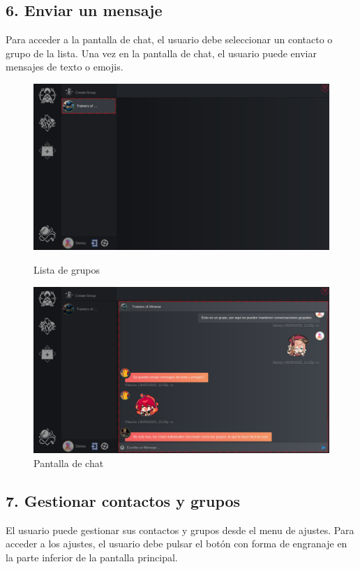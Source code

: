 \subsection*{6. Enviar un mensaje}
Para acceder a la pantalla de chat, el usuario debe seleccionar un contacto o grupo de la lista.
Una vez en la pantalla de chat, el usuario puede enviar mensajes de texto o emojis.

\begin{figure}[H]
    \centering
    \begin{minipage}[b]{0.48\textwidth}
        \centering
        \includegraphics[width=\textwidth]{images/manualDeUsuario/EnviarMensaje1.png}
        \caption*{Lista de grupos}
    \end{minipage}
    \hfill
    \begin{minipage}[b]{0.48\textwidth}
        \centering
        \includegraphics[width=\textwidth]{images/manualDeUsuario/EnviarMensaje2.png}
        \caption*{Pantalla de chat}
    \end{minipage}
\end{figure}

\subsection*{7. Gestionar contactos y grupos}
El usuario puede gestionar sus contactos y grupos desde el menu de ajustes.
Para acceder a los ajustes, el usuario debe pulsar el botón con forma de engranaje en la parte inferior de la pantalla principal.

